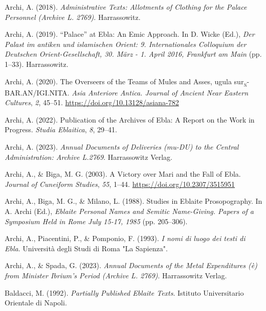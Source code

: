 \documentclass[
]{book}
\newlength{\cslhangindent}
\newlength{\cslentryspacingunit} %
\newenvironment{CSLReferences}[2] %
 {%
  \setlength{\parindent}{0pt}
  \ifodd #1
  \let\oldpar\par
  \def\par{\hangindent=\cslhangindent\oldpar}
  \fi
  \setlength{\parskip}{#2\cslentryspacingunit}
 }%
 {}
\begin{document}
\begin{CSLReferences}{1}{0}
\leavevmode{}%
Archi, A. (2018). \emph{Administrative {Texts}: {Allotments} of {Clothing} for the {Palace Personnel} ({Archive L}. 2769)}. Harrassowitz.

\leavevmode{}%
Archi, A. (2019). {``Palace''} at Ebla: An Emic Approach. In D. Wicke (Ed.), \emph{Der Palast im antiken und islamischen Orient: 9. Internationales Colloquium der Deutschen Orient-Gesellschaft, 30. März - 1. April 2016, Frankfurt am Main} (pp. 1--33). Harrassowitz.

\leavevmode{}%
Archi, A. (2020). The Overseers of the Teams of Mules and Asses, ugula sur\textsubscript{x}-BAR.AN/IGI.NITA. \emph{Asia Anteriore Antica. Journal of Ancient Near Eastern Cultures}, \emph{2}, 45--51. \url{https://doi.org/10.13128/asiana-782}

\leavevmode{}%
Archi, A. (2022). Publication of the {Archives} of {Ebla}: {A Report} on the {Work} in {Progress}. \emph{Studia Eblaitica}, \emph{8}, 29--41.

\leavevmode{}%
Archi, A. (2023). \emph{Annual {Documents} of {Deliveries} (mu-{DU}) to the {Central Administration}: {Archive L}.2769}. Harrassowitz Verlag.

\leavevmode{}%
Archi, A., \& Biga, M. G. (2003). A {Victory} over {Mari} and the {Fall} of {Ebla}. \emph{Journal of Cuneiform Studies}, \emph{55}, 1--44. \url{https://doi.org/10.2307/3515951}

\leavevmode{}%
Archi, A., Biga, M. G., \& Milano, L. (1988). Studies in {Eblaite Prosopography}. In A. Archi (Ed.), \emph{Eblaite {Personal Names} and {Semitic Name-Giving}. {Papers} of a {Symposium Held} in {Rome July} 15-17, 1985} (pp. 205--306).

\leavevmode{}%
Archi, A., Piacentini, P., \& Pomponio, F. (1993). \emph{I nomi di luogo dei testi di Ebla}. Università degli Studi di Roma "La Sapienza".

\leavevmode{}%
Archi, A., \& Spada, G. (2023). \emph{Annual {Documents} of the {Metal Expenditures} (è) from {Minister Ibrium}'s {Period} ({Archive L}. 2769)}. Harrassowitz Verlag.

\leavevmode{}%
Baldacci, M. (1992). \emph{Partially {Published Eblaite Texts}}. Istituto Universitario Orientale di Napoli.


\end{CSLReferences}
\end{document}
